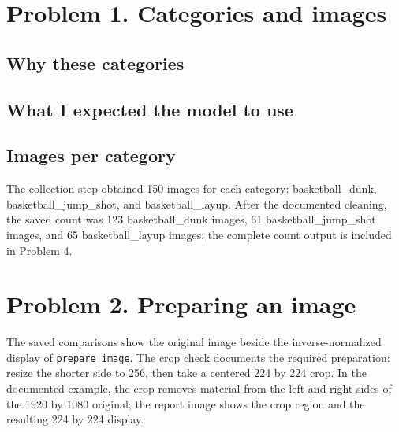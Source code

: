 \documentclass[11pt]{article}
\begin{document}
\makeheader

\section*{Problem 1. Categories and images}

\subsection*{Why these categories}

\subsection*{What I expected the model to use}

\subsection*{Images per category}
The collection step obtained 150 images for each category: basketball\_dunk, basketball\_jump\_shot, and basketball\_layup. After the documented cleaning, the saved count was 123 basketball\_dunk images, 61 basketball\_jump\_shot images, and 65 basketball\_layup images; the complete count output is included in Problem 4.

\section*{Problem 2. Preparing an image}


The saved comparisons show the original image beside the inverse-normalized display of \texttt{prepare\_image}. The crop check documents the required preparation: resize the shorter side to 256, then take a centered 224 by 224 crop. In the documented example, the crop removes material from the left and right sides of the 1920 by 1080 original; the report image shows the crop region and the resulting 224 by 224 display.
\end{document}
